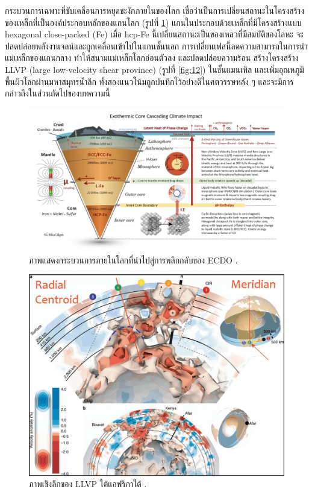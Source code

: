 \documentclass[10pt,twocolumn,letterpaper]{article}
\begin{document}
กระบวนการเฉพาะที่ขับเคลื่อนการหยุดชะงักภายในของโลก เชื่อว่าเป็นการเปลี่ยนสถานะในโครงสร้างของเหล็กที่เป็นองค์ประกอบหลักของแกนโลก (รูปที่ \ref{fig:11}) แกนในประกอบด้วยเหล็กที่มีโครงสร้างแบบ hexagonal close-packed (Fe) \cite{141} เมื่อ hcp-Fe นี้เปลี่ยนสถานะเป็นของเหลวที่มีสมบัติของโลหะ จะปลดปล่อยพลังงานจลน์และถูกเคลื่อนเข้าไปในแกนชั้นนอก การเปลี่ยนเฟสนี้ลดความสามารถในการนำแม่เหล็กของแกนกลาง ทำให้สนามแม่เหล็กโลกอ่อนตัวลง และปลดปล่อยความร้อน สร้างโครงสร้าง LLVP (large low-velocity shear province) (รูปที่ \ref{fig:12}) \cite{38} ในชั้นแมนเทิล และเพิ่มอุณหภูมิพื้นผิวโลกผ่านมหาสมุทรน้ำลึก ทั้งสองแนวโน้มถูกบันทึกไว้อย่างดีในศตวรรษหลัง ๆ และจะมีการกล่าวถึงในส่วนถัดไปของบทความนี้

\begin{figure}[t]
\begin{center}
\includegraphics[width=1\textwidth]{layers.jpg}
\end{center}
   \caption{ภาพแสดงกระบวนการภายในโลกที่นำไปสู่การพลิกกลับของ ECDO \cite{129}.}
\label{fig:11}
\end{figure}


\begin{figure}[t]
\begin{center}
   \includegraphics[width=1\linewidth]{llvp.jpg}
\end{center}
   \caption{ภาพเชิงลึกของ LLVP ใต้แอฟริกาใต้ \cite{28}.}
\label{fig:12}
\label{fig:onecol}
\end{figure}
\end{document}
